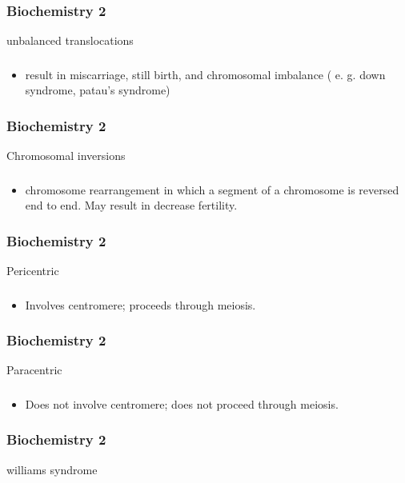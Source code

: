 \documentclass[11pt]{beamer}
\begin{document}
\begin{frame}
 \frametitle{Biochemistry 2}
unbalanced translocations 
\end{frame}

\begin{frame}
 \frametitle{}
\begin{itemize}
\item result in miscarriage, still birth, and chromosomal imbalance ( e. g. down syndrome, patau's syndrome) 
\end{itemize}
\end{frame}

\begin{frame}
 \frametitle{Biochemistry 2}
Chromosomal inversions
\end{frame}

\begin{frame}
 \frametitle{}
\begin{itemize}
\item chromosome rearrangement in which a segment of a chromosome is reversed end to end. May result in decrease fertility. 
\end{itemize}
\end{frame}

\begin{frame}
 \frametitle{Biochemistry 2}
Pericentric
\end{frame}

\begin{frame}
 \frametitle{}
\begin{itemize}
\item Involves centromere; proceeds through meiosis.
\end{itemize}
\end{frame}

\begin{frame}
 \frametitle{Biochemistry 2}
Paracentric 
\end{frame}

\begin{frame}
 \frametitle{}
\begin{itemize}
\item Does not involve centromere; does not proceed through meiosis.
\end{itemize}
\end{frame}

\begin{frame}
 \frametitle{Biochemistry 2}
williams syndrome
\end{frame}
\end{document}
